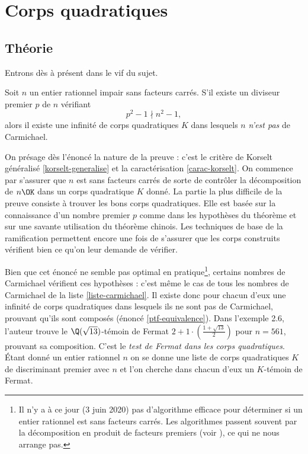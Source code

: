 \section{Corps quadratiques}

\subsection{Théorie}

Entrons dès à présent dans le vif du sujet. 

\begin{theoreme}\label{theoreme-2.5}
	Soit $n$ un entier rationnel impair sans facteurs carrés. S'il existe un diviseur premier $p$ de $n$ vérifiant $$p^2 - 1 \nmid n^2 - 1,$$ alors il existe une infinité de corps quadratiques $K$ dans lesquels $n$ \emph{n'est pas} de Carmichael.
\end{theoreme}

\begin{MotSurPreuve}
	On présage dès l'énoncé la nature de la preuve : c'est le critère de Korselt généralisé \ref{korselt-generalise} et la caractérisation \ref{carac-korselt}. On commence par s'assurer que $n$ est sans facteurs carrés de sorte de contrôler la décomposition de $n\OK$ dans un corps quadratique $K$ donné. La partie la plus difficile de la preuve consiste à trouver les bons corps quadratiques. Elle est basée sur la connaissance d'un nombre premier $p$ comme dans les hypothèses du théorème et sur une savante utilisation du théorème chinois. Les techniques de base de la ramification permettent encore une fois de s'assurer que les corps construits vérifient bien ce qu'on leur demande de vérifier. \\
\end{MotSurPreuve}

Bien que cet énoncé ne semble pas optimal en pratique\footnote{Il n'y a à ce jour (3 juin 2020) pas d'algorithme efficace pour déterminer si un entier rationnel est sans facteurs carrés. Les algorithmes passent souvent par la décomposition en produit de facteurs premiers (voir \cite{SquareFree}), ce qui ne nous arrange pas.}, certains nombres de Carmichael vérifient ces hypothèses : c'est même le cas de tous les nombres de Carmichael de la liste \ref{liste-carmichael}. Il existe donc pour chacun d'eux une infinité de corps quadratiques dans lesquels ils ne sont pas de Carmichael, prouvant qu'ils sont composés (énoncé \ref{ptf-equivalence}). Dans l'exemple 2.6, l'auteur trouve le $\Q(\sqrt{13})$-témoin de Fermat $2 + 1\cdot \left(\frac{1 + \sqrt{13}}{2}\right)$ pour $n=561$, prouvant sa composition. C'est le \emph{test de Fermat dans les corps quadratiques}. Étant donné un entier rationnel $n$ on se donne une liste de corps quadratiques $K$ de discriminant premier avec $n$ et l'on cherche dans chacun d'eux un $K$-témoin de Fermat. \\


